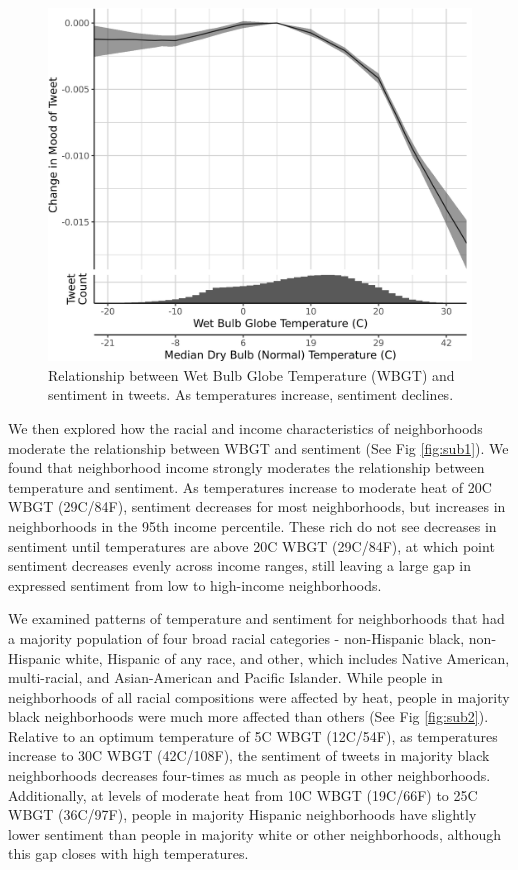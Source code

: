 \documentclass{article}
\begin{document}
\begin{figure}[H]
  \centering
  \includegraphics[width=0.5\linewidth]{../res/wbgt.png}
  \caption{Relationship between Wet Bulb Globe Temperature (WBGT) and sentiment in tweets.  As temperatures increase, sentiment declines.}
  \label{fig:wbgt}
\end{figure}

We then explored how the racial and income characteristics of neighborhoods moderate the relationship between WBGT and sentiment (See Fig \ref{fig:sub1}).  We found that neighborhood income strongly moderates the relationship between temperature and sentiment.  As temperatures increase to moderate heat of 20\textdegree C WBGT (29\textdegree C/84\textdegree F), sentiment decreases for most neighborhoods, but increases in neighborhoods in the 95th income percentile.  These rich do not see decreases in sentiment until temperatures are above 20\textdegree C WBGT (29\textdegree C/84\textdegree F), at which point sentiment decreases evenly across income ranges, still leaving a large gap in expressed sentiment from low to high-income neighborhoods.

We examined patterns of temperature and sentiment for neighborhoods that had a majority population of four broad racial categories - non-Hispanic black, non-Hispanic white, Hispanic of any race, and other, which includes Native American, multi-racial, and Asian-American and Pacific Islander.  While people in neighborhoods of all racial compositions were affected by heat, people in majority black neighborhoods were much more affected than others  (See Fig \ref{fig:sub2}).  Relative to an optimum temperature of 5\textdegree C WBGT (12\textdegree C/54\textdegree F), as temperatures increase to 30\textdegree C WBGT (42\textdegree C/108\textdegree F), the sentiment of tweets in majority black neighborhoods decreases four-times as much as people in other neighborhoods.  Additionally, at levels of moderate heat from 10\textdegree C WBGT (19\textdegree C/66\textdegree F) to 25\textdegree C WBGT (36\textdegree C/97\textdegree F), people in majority Hispanic neighborhoods have slightly lower sentiment than people in majority white or other neighborhoods, although this gap closes with high temperatures.
\end{document}
